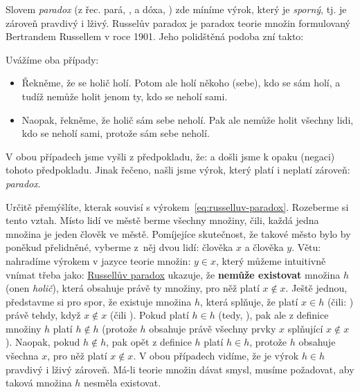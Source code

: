 \begin{example}
  \label{exam:russelluv-paradox}
  Slovem \emph{paradox} (z řec. \textgreek{pará}, , a
  \textgreek{dóxa}, ) zde míníme výrok, který je \emph{sporný},
  tj. je zároveň pravdivý i lživý. Russelův paradox je paradox teorie množin
  formulovaný Bertrandem Russellem v roce 1901.  Jeho polidštěná podoba zní
  takto: 

  Uvážíme oba případy:
  \begin{itemize}
    \item Řekněme, že se holič holí. Potom ale holí někoho (sebe), kdo se sám
      holí, a tudíž nemůže holit jenom ty, kdo se neholí sami.
    \item Naopak, řekněme, že holič sám sebe neholí. Pak ale nemůže holit
      všechny lidi, kdo se neholí sami, protože sám sebe neholí.
  \end{itemize}
  V obou případech jsme vyšli z předpokladu, že:  a došli jsme k opaku (negaci) tohoto
  předpokladu. Jinak řečeno, našli jsme výrok, který platí i neplatí zároveň:
  \emph{paradox}.
\end{example}

Určitě přemýšlíte, kterak souvisí  s
výrokem~\eqref{eq:russelluv-paradox}. Rozeberme si tento vztah. Místo lidí ve
městě berme všechny množiny, čili, každá jedna množina je jeden člověk ve městě.
Pomíjejíce skutečnost, že takové město bylo by poněkud přelidněné, vyberme z~něj
dvou lidí: člověka $x$ a člověka $y$. Větu:  nahradíme výrokem
v jazyce teorie množin: $y \in x$, který můžeme intuitivně vnímat třeba jako:
\hyperref[exam:russelluv-paradox]{Russellův paradox} ukazuje, že \textbf{nemůže
existovat} množina $h$ (onen \emph{holič}), která obsahuje právě ty množiny, pro
něž platí $x \notin x$. Ještě jednou, představme si pro spor, že existuje
množina $h$, která splňuje, že platí $x \in h$ (čili: ) právě
tehdy, když $x \notin x$ (čili ). Pokud platí $h \in h$
(tedy, ), pak ale z definice množiny $h$ platí $h \notin h$
(protože $h$ obsahuje právě všechny prvky $x$ splňující $x \notin x$). Naopak,
pokud $h \notin h$, pak opět z definice $h$ platí $h \in h$, protože $h$
obsahuje všechna $x$, pro něž platí $x \notin x$. V obou případech vidíme, že je
výrok $h \in h$ pravdivý i lživý zároveň. Má-li teorie množin dávat smysl,
musíme požadovat, aby taková množina $h$ nesměla existovat.

